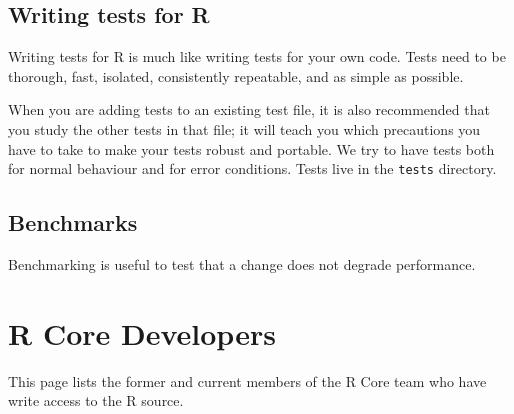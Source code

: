 \documentclass[
  letterpaper,
  DIV=11,
  numbers=noendperiod]{scrreprt}
\begin{document}
\section{Writing tests for R}\label{writing-tests-for-r}

Writing tests for R is much like writing tests for your own code. Tests
need to be thorough, fast, isolated, consistently repeatable, and as
simple as possible.

When you are adding tests to an existing test file, it is also
recommended that you study the other tests in that file; it will teach
you which precautions you have to take to make your tests robust and
portable. We try to have tests both for normal behaviour and for error
conditions. Tests live in the \texttt{tests} directory.

\section{Benchmarks}\label{benchmarks}

Benchmarking is useful to test that a change does not degrade
performance.


\chapter{R Core Developers}\label{CoreDev}

This page lists the former and current members of the R Core team who
have write access to the R source.
\end{document}
